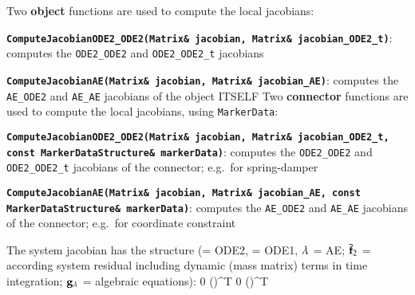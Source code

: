 Two {\bf object} functions are used to compute the local jacobians:
\bi
  \item \texttt{\bf ComputeJacobianODE2\_ODE2(Matrix\& jacobian, Matrix\& jacobian\_ODE2\_t)}: computes the \texttt{ODE2\_ODE2} and \texttt{ODE2\_ODE2\_t} jacobians
	\item \texttt{\bf ComputeJacobianAE(Matrix\& jacobian, Matrix\& jacobian\_AE)}: computes the \texttt{AE\_ODE2} and \texttt{AE\_AE} jacobians of the object ITSELF
\ei
Two {\bf connector} functions are used to compute the local jacobians, using \texttt{MarkerData}:
\bi
  \item \texttt{\bf ComputeJacobianODE2\_ODE2(Matrix\& jacobian, Matrix\& jacobian\_ODE2\_t, const MarkerDataStructure\& markerData)}: computes the \texttt{ODE2\_ODE2} and \texttt{ODE2\_ODE2\_t} jacobians of the connector; e.g.\ for spring-damper
	\item \texttt{\bf ComputeJacobianAE(Matrix\& jacobian, Matrix\& jacobian\_AE, const MarkerDataStructure\& markerData)}: computes the \texttt{AE\_ODE2} and \texttt{AE\_AE} jacobians of the connector; e.g.\ for coordinate constraint
\ei

The system jacobian has the structure (\SO = ODE2, \FO = ODE1, $\lambda$ = AE; $\bar {\mathbf{f}}_2$ = according system residual including dynamic (mass matrix) terms in time integration; $\mathbf{g}_\lambda$ = algebraic equations):
\be
  \bigmr
  {\frac{\partial \bar \fv_\SO}{\partial \qv_\SO}} {0} {\left(\frac{\partial \gv_\AE}{\partial \qv_\SO}\right)^T}
  {0} {\frac{\partial \fv_\FO}{\partial \qv_\FO}} {\left(\frac{\partial \gv_\AE}{\partial \qv_\FO}\right)^T}
	{\frac{\partial \gv_\AE}{\partial \qv_\SO}} {\frac{\partial \gv_\AE}{\partial \qv_\FO}} {\frac{\partial \gv_\AE}{\partial \qv_\AE}}
\ee

